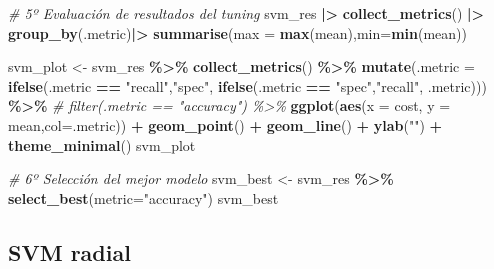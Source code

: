 \documentclass[12pt,a4paper,]{book}
\newenvironment{Shaded}{\begin{snugshade}}{\end{snugshade}}
\newcommand{\AttributeTok}[1]{\textcolor[rgb]{0.13,0.29,0.53}{#1}}
\newcommand{\CommentTok}[1]{\textcolor[rgb]{0.56,0.35,0.01}{\textit{#1}}}
\newcommand{\FunctionTok}[1]{\textcolor[rgb]{0.13,0.29,0.53}{\textbf{#1}}}
\newcommand{\NormalTok}[1]{#1}
\newcommand{\OtherTok}[1]{\textcolor[rgb]{0.56,0.35,0.01}{#1}}
\newcommand{\SpecialCharTok}[1]{\textcolor[rgb]{0.81,0.36,0.00}{\textbf{#1}}}
\newcommand{\StringTok}[1]{\textcolor[rgb]{0.31,0.60,0.02}{#1}}
\numberwithin{dummy}{section}
\theoremstyle{ocrenumbox}
\theoremstyle{blacknumex}
\theoremstyle{blacknumbox}
\theoremstyle{ocrenum}
\theoremstyle{ocrenum}
\begin{document}
\begin{Shaded}
\begin{Highlighting}[]
\CommentTok{\# 5º Evaluación de resultados del tuning}
\NormalTok{svm\_res }\SpecialCharTok{|\textgreater{}} 
  \FunctionTok{collect\_metrics}\NormalTok{() }\SpecialCharTok{|\textgreater{}} 
  \FunctionTok{group\_by}\NormalTok{(.metric)}\SpecialCharTok{|\textgreater{}} 
  \FunctionTok{summarise}\NormalTok{(}\AttributeTok{max =} \FunctionTok{max}\NormalTok{(mean),}\AttributeTok{min=}\FunctionTok{min}\NormalTok{(mean))}

\NormalTok{svm\_plot }\OtherTok{\textless{}{-}} 
\NormalTok{  svm\_res }\SpecialCharTok{\%\textgreater{}\%} 
  \FunctionTok{collect\_metrics}\NormalTok{() }\SpecialCharTok{\%\textgreater{}\%}  
  \FunctionTok{mutate}\NormalTok{(}\AttributeTok{.metric =} \FunctionTok{ifelse}\NormalTok{(.metric }\SpecialCharTok{==} \StringTok{"recall"}\NormalTok{,}\StringTok{"spec"}\NormalTok{,}
                          \FunctionTok{ifelse}\NormalTok{(.metric }\SpecialCharTok{==} \StringTok{"spec"}\NormalTok{,}\StringTok{"recall"}\NormalTok{,}
\NormalTok{                                 .metric))) }\SpecialCharTok{\%\textgreater{}\%} 
  \CommentTok{\# filter(.metric == "accuracy") \%\textgreater{}\%}
  \FunctionTok{ggplot}\NormalTok{(}\FunctionTok{aes}\NormalTok{(}\AttributeTok{x =}\NormalTok{ cost, }\AttributeTok{y =}\NormalTok{ mean,}\AttributeTok{col=}\NormalTok{.metric)) }\SpecialCharTok{+} 
  \FunctionTok{geom\_point}\NormalTok{() }\SpecialCharTok{+} 
  \FunctionTok{geom\_line}\NormalTok{() }\SpecialCharTok{+} 
  \FunctionTok{ylab}\NormalTok{(}\StringTok{""}\NormalTok{) }\SpecialCharTok{+}
  \FunctionTok{theme\_minimal}\NormalTok{()}
\NormalTok{svm\_plot}

\CommentTok{\# 6º Selección del mejor modelo}
\NormalTok{svm\_best }\OtherTok{\textless{}{-}} 
\NormalTok{  svm\_res }\SpecialCharTok{\%\textgreater{}\%} 
  \FunctionTok{select\_best}\NormalTok{(}\AttributeTok{metric=}\StringTok{"accuracy"}\NormalTok{)}
\NormalTok{svm\_best}
\end{Highlighting}
\end{Shaded}

\hypertarget{svm-radial}{%
\subsection{SVM radial}\label{svm-radial}}
\end{document}
